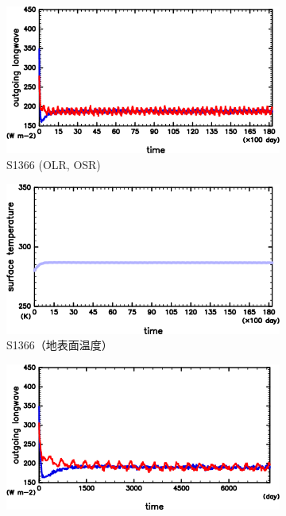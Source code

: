 \documentclass[body]{subfiles}
\begin{document}
\begin{figure}[t]
	\centering
	\begin{subfigure}{.4\textwidth}
		\centering
		\includegraphics[width=\columnwidth]{S1366/S1366_OLRA-OSRA_horimean_time0.0-18250.0-crop.png}
		\caption{S1366 (OLR, OSR)}\label{S1366_OLRA}
	\end{subfigure}
	\begin{subfigure}{.4\textwidth}
		\centering
		\includegraphics[width=\columnwidth]{S1366/S1366_SurfTemp_horimean_time0.0-18250.0-crop.png}
		\caption{S1366（地表面温度）}\label{S1366_SurfTemp}
	\end{subfigure}
	\begin{subfigure}{.4\textwidth}
		\centering
		\includegraphics[width=\columnwidth]{S1500/S1500_OLRA-OSRA_horimean_time0.0-7300.0-crop.png}

\end{subfigure}
\end{figure}
\end{document}
